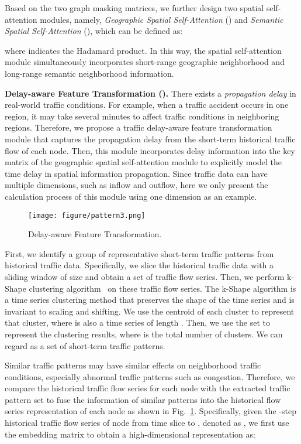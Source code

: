 \documentclass[letterpaper]{article} \usepackage{aaai23}  \usepackage{times}  \usepackage{helvet}  \usepackage{courier}  \usepackage[hyphens]{url}  \usepackage{graphicx} \urlstyle{rm} \def\UrlFont{\rm}  \usepackage{natbib}  \usepackage{caption} \frenchspacing  \setlength{\pdfpagewidth}{8.5in} \setlength{\pdfpageheight}{11in} \usepackage{algorithm}
\newcommand{\paratitle}[1]{\vspace{1.5ex}\noindent\textbf{#1}}
\newcommand{\gssa}{\xspace}
\newcommand{\sssa}{\xspace}
\newcommand{\dft}{\xspace}
\begin{document}
Based on the two graph masking matrices, we further design two spatial self-attention modules, namely, \emph{Geographic Spatial Self-Attention} (\gssa) and \emph{Semantic Spatial Self-Attention} (\sssa), which can be defined as:

where  indicates the Hadamard product. In this way, the spatial self-attention module simultaneously incorporates short-range geographic neighborhood and long-range semantic neighborhood information.



\paratitle{Delay-aware Feature Transformation (\dft).}
There exists a \emph{propagation delay} in real-world traffic conditions. For example, when a traffic accident occurs in one region, it may take several minutes to affect traffic conditions in neighboring regions. Therefore, we propose a traffic delay-aware feature transformation module that captures the propagation delay from the short-term historical traffic flow of each node. Then, this module incorporates delay information into the key matrix of the geographic spatial self-attention module to explicitly model the time delay in spatial information propagation. Since traffic data can have multiple dimensions, such as inflow and outflow, here we only present the calculation process of this module using one dimension as an example.



\begin{figure}[t]
    \centering
    \texttt{[image: figure/pattern3.png]}
    \caption{Delay-aware Feature Transformation.}
    \label{fig:pattern}
\end{figure}


First, we identify a group of representative short-term traffic patterns from historical traffic data. Specifically, we slice the historical traffic data with a sliding window of size  and obtain a set of traffic flow series. Then, we perform k-Shape clustering algorithm~\cite{kshape} on these traffic flow series. The k-Shape algorithm is a time series clustering method that preserves the shape of the time series and is invariant to scaling and shifting. We use the centroid  of each cluster to represent that cluster, where  is also a time series of length . Then, we use the set  to represent the clustering results, where  is the total number of clusters. We can regard  as a set of short-term traffic patterns.



Similar traffic patterns may have similar effects on neighborhood traffic conditions, especially abnormal traffic patterns such as congestion. Therefore, we compare the historical traffic flow series for each node with the extracted traffic pattern set  to fuse the information of similar patterns into the historical flow series representation of each node as shown in Fig.~\ref{fig:pattern}. Specifically, given the -step historical traffic flow series of node  from time slice  to , denoted as , we first use the embedding matrix  to obtain a high-dimensional representation  as:
\end{document}
